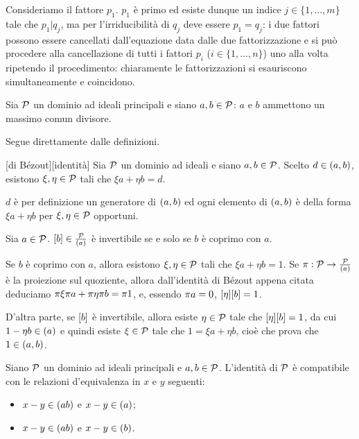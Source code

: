 \par Consideriamo il fattore $p_1$. $p_1$ \`e primo ed esiste dunque un indice $j \in \lbrace 1, ..., m \rbrace$ tale che $p_1 | q_j$, ma per l'irriducibilit\`a di $q_j$ deve essere $p_1 = q_j$: i due fattori possono essere cancellati dall'equazione data dalle due fattorizzazione e si pu\`o procedere alla cancellazione di tutti i fattori $p_i$ ($i \in \lbrace 1, ..., n \rbrace$) uno alla volta ripetendo il procedimento: chiaramente le fattorizzazioni si esauriscono simultaneamente e coincidono. \EndProof
\begin{Theorem}
	Sia $\mathcal{P}$ un dominio ad ideali principali e siano $a, b \in \mathcal{P}$: $a$ e $b$ ammettono un massimo comun divisore.
\end{Theorem}
\Proof Segue direttamente dalle definizioni. \EndProof
\begin{Theorem}
	[di B\'ezout][identit\`a] Sia $\mathcal{P}$ un dominio ad ideali e siano $a, b \in \mathcal{P}$. Scelto $d \in \left ( a,b \right )$, esistono $\xi, \eta \in \mathcal{P}$ tali che $\xi a + \eta b = d$.
\end{Theorem}
\Proof $d$ \`e per definizione un generatore di $\left ( a,b \right )$ ed ogni elemento di $\left ( a,b \right )$ \`e della forma $\xi a + \eta b$ per $\xi, \eta \in \mathcal{P}$ opportuni. \EndProof
\begin{Theorem}
	Sia $a \in \mathcal{P}$. $\EquivalenceClass{b} \in \Quotient{\PID}{\SpanIdeal{a}}$ \`e invertibile se e solo se $b$ \`e coprimo con $a$.
\end{Theorem}
\Proof Se $b$ \`e coprimo con $a$, allora esistono $\xi, \eta \in \mathcal{P}$ tali che $\xi a + \eta b = 1$. Se $\Projection: \PID \rightarrow \Quotient{\PID}{\SpanIdeal{a}}$ \`e la proiezione sul quoziente, allora dall'identit\`a di B\'ezout appena citata deduciamo $\Projection{\xi}\Projection{a} + \Projection{\eta}\Projection{b} = \Projection{1}$, e, essendo $\Projection{a} = 0$, $\EquivalenceClass{\eta}\EquivalenceClass{b} = 1$.
\par D'altra parte, se $\EquivalenceClass{b}$ \`e invertibile, allora esiste $\eta \in \mathcal{P}$ tale che $\EquivalenceClass{\eta}\EquivalenceClass{b} = 1$, da cui $1 - \eta b \in \left ( a \right )$ e quindi esiste $\xi \in \mathcal{P}$ tale che $1 = \xi a + \eta b$, cio\`e che prova che $1 \in \left ( a,b \right )$. \EndProof
\begin{Theorem}
	Siano $\mathcal{P}$ un dominio ad ideali principali e $a, b \in \mathcal{P}$. L'identit\`a di $\mathcal{P}$ \`e compatibile con le relazioni d'equivalenza in $x$ e $y$ seguenti:
	\begin{itemize}
		\item $x - y \in \left ( ab \right )$ e $x - y \in \left ( a \right )$;
		\item $x - y \in \left ( ab \right )$ e $x - y \in \left ( b \right )$.
	\end{itemize}
\end{Theorem}
